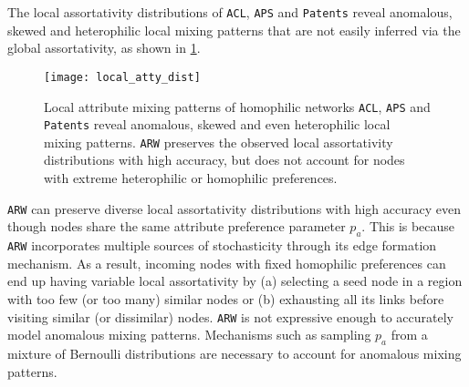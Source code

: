 The local assortativity distributions
of \texttt{ACL}, \texttt{APS} and \texttt{Patents} reveal anomalous, skewed
and heterophilic local mixing patterns that are not easily inferred via the global assortativity,
as shown in \cref{fig:local_atty}.
\begin{figure}
	\centering
	\vspace{-5pt}
	\texttt{[image: local\_atty\_dist]}
	\caption{Local attribute mixing patterns of homophilic networks \texttt{ACL}, \texttt{APS}
		and \texttt{Patents} reveal anomalous, skewed and even heterophilic local mixing patterns.
		\texttt{ARW} preserves the observed local assortativity distributions with high accuracy,
	but does not account for nodes with extreme heterophilic or homophilic preferences.}
	\label{fig:local_atty}
	\vspace{-15pt}
\end{figure}
\texttt{ARW} can preserve
diverse local assortativity distributions with high accuracy even though nodes
share the same attribute preference parameter $p_a$. This is because  \texttt{ARW}
incorporates multiple sources of stochasticity through its edge formation
mechanism. As a result, incoming nodes with fixed homophilic preferences can end
up having variable local assortativity by (a) selecting a seed node in a region
with too few (or too many) similar nodes or (b) exhausting all its links before
visiting similar (or dissimilar) nodes.
\texttt{ARW} is not expressive enough to accurately model anomalous
mixing patterns. Mechanisms such as sampling $p_a$ from a mixture of
Bernoulli distributions are necessary to account for anomalous mixing patterns.
